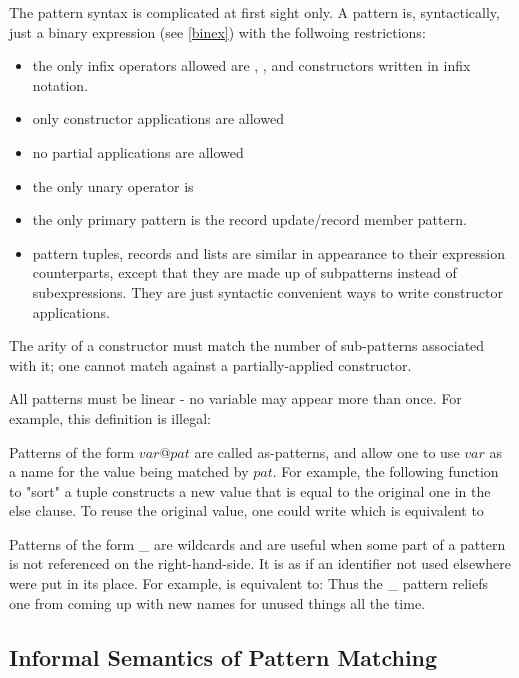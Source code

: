 The pattern syntax is complicated at first sight only. A pattern is, syntactically, just a binary expression (see \autoref{binex}) with the follwoing restrictions:
\begin{itemize}
\item the only infix operators allowed are , , \sym{:} and constructors written in infix notation.
\item only constructor applications are allowed
\item no partial applications are allowed
\item the only unary operator is \sym{!}
\item the only primary pattern is the record update/record member pattern.
\item pattern tuples, records and lists are similar in appearance to their expression counterparts, except that they are made up of subpatterns instead of subexpressions. They are just syntactic convenient ways to write constructor applications.
\end{itemize}

The arity of a constructor must match the number of sub-patterns associated with it; one cannot match against a partially-applied constructor.

All patterns must be linear - no variable may appear more than once. For example, this definition is illegal:

Patterns of the form
$var$@$pat$
are called as-patterns, and allow one to use
$var$
as a name for the
value being matched by $pat$. For example, the following function to "sort" a tuple
constructs a new value that is equal to the original one in the else clause. To reuse the original value, one could write
which is equivalent to

Patterns of the form \_ are wildcards and are useful when some part of a pattern is not referenced on
the right-hand-side. It is as if an identifier not used elsewhere were put in its place. For example,
is equivalent to:
Thus the \_ pattern reliefs one from coming up with new names for unused things all the time.

\subsection{Informal Semantics of Pattern Matching}

